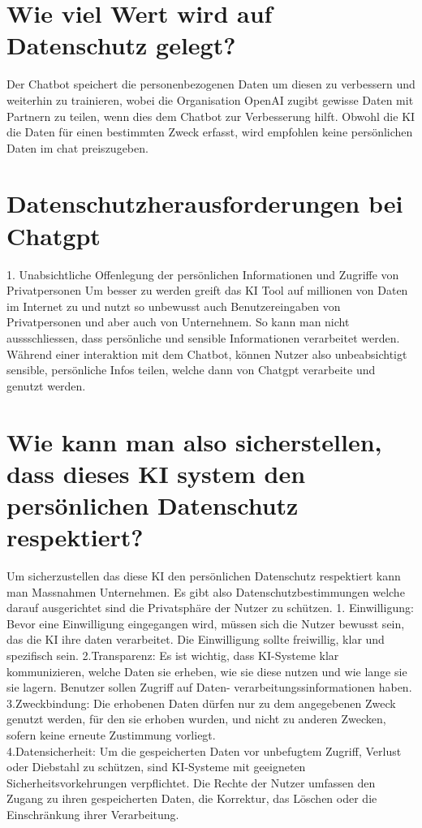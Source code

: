 \documentclass{report}
\begin{document}
\section{Wie viel Wert wird auf Datenschutz gelegt?}
    Der Chatbot speichert die personenbezogenen Daten um diesen zu verbessern und weiterhin zu trainieren, wobei die Organisation OpenAI zugibt gewisse Daten mit Partnern zu teilen, wenn dies dem Chatbot zur Verbesserung hilft.
    Obwohl die KI die Daten für einen bestimmten Zweck erfasst, wird empfohlen keine persönlichen Daten im chat preiszugeben.

\section{Datenschutzherausforderungen bei Chatgpt}
1. Unabsichtliche Offenlegung der persönlichen Informationen und Zugriffe von Privatpersonen
Um besser zu werden greift das KI Tool auf millionen von Daten im Internet zu und nutzt so unbewusst auch Benutzereingaben von Privatpersonen und aber auch von Unternehnem.
So kann man nicht aussschliessen, dass persönliche und sensible Informationen verarbeitet werden.
Während einer interaktion mit dem Chatbot, können Nutzer also unbeabsichtigt sensible, persönliche Infos teilen, welche dann von Chatgpt verarbeite und genutzt werden. 


\section{Wie kann man also sicherstellen, dass dieses KI system den persönlichen Datenschutz respektiert?}
Um sicherzustellen das diese KI den persönlichen Datenschutz respektiert kann man Massnahmen Unternehmen.
Es gibt also Datenschutzbestimmungen welche darauf ausgerichtet sind die Privatsphäre der Nutzer zu schützen. 
1. Einwilligung: Bevor eine Einwilligung eingegangen wird, müssen sich die Nutzer bewusst sein, das die KI ihre daten verarbeitet.
Die Einwilligung sollte freiwillig, klar und spezifisch sein.
2.Transparenz: Es ist wichtig, dass KI-Systeme klar kommunizieren, welche Daten sie erheben, wie sie diese nutzen und wie lange sie sie lagern. Benutzer sollen Zugriff auf Daten-
verarbeitungssinformationen haben.
3.Zweckbindung: Die erhobenen Daten dürfen nur zu dem angegebenen Zweck genutzt werden, für den sie erhoben wurden, und nicht zu anderen Zwecken, sofern keine erneute Zustimmung vorliegt.\\

4.Datensicherheit: Um die gespeicherten Daten vor unbefugtem Zugriff, Verlust oder Diebstahl zu schützen, sind KI-Systeme mit geeigneten Sicherheitsvorkehrungen verpflichtet.
Die Rechte der Nutzer umfassen den Zugang zu ihren gespeicherten Daten, die Korrektur, das Löschen oder die Einschränkung ihrer Verarbeitung.
\end{document}
